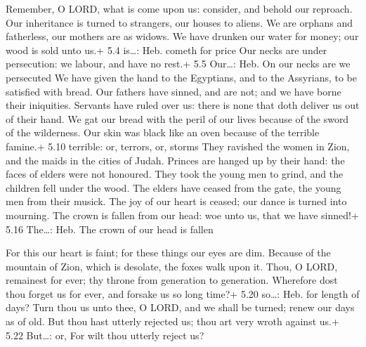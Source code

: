  Remember, O LORD, what is come upon us: consider, and
behold our reproach.  Our inheritance is turned to
strangers, our houses to aliens.  We are orphans and
fatherless, our mothers are as widows.  We have drunken our
water for money; our wood is sold unto us.+ 5.4 is\ldots: Heb. cometh
for price  Our necks are under persecution: we labour, and
have no rest.+ 5.5 Our\ldots: Heb. On our necks are we persecuted
 We have given the hand to the Egyptians, and to the
Assyrians, to be satisfied with bread.  Our fathers have
sinned, and are not; and we have borne their iniquities. 
Servants have ruled over us: there is none that doth deliver us out of
their hand.  We gat our bread with the peril of our lives
because of the sword of the wilderness.  Our skin was black
like an oven because of the terrible famine.+ 5.10 terrible: or,
terrors, or, storms  They ravished the women in Zion, and
the maids in the cities of Judah.  Princes are hanged up by
their hand: the faces of elders were not honoured.  They
took the young men to grind, and the children fell under the wood.
 The elders have ceased from the gate, the young men from
their musick.  The joy of our heart is ceased; our dance is
turned into mourning.  The crown is fallen from our head:
woe unto us, that we have sinned!+ 5.16 The\ldots: Heb. The crown of our
head is fallen

 For this our heart is faint; for these things our eyes are
dim.  Because of the mountain of Zion, which is desolate,
the foxes walk upon it.  Thou, O LORD, remainest for ever;
thy throne from generation to generation.  Wherefore dost
thou forget us for ever, and forsake us so long time?+ 5.20 so\ldots:
Heb. for length of days?  Turn thou us unto thee, O LORD,
and we shall be turned; renew our days as of old.  But thou
hast utterly rejected us; thou art very wroth against us.+ 5.22
But\ldots: or, For wilt thou utterly reject us?
